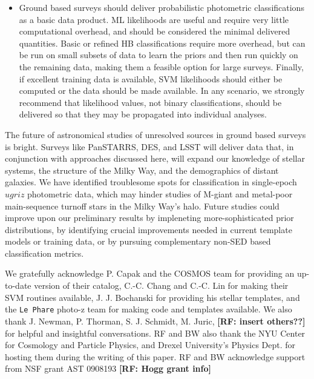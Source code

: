 \documentclass[12pt,preprint]{aastex}
\newcommand\rf[1]{{\bf [RF: #1]}}
\begin{document}
\begin{itemize}
\item Ground based surveys should deliver probabilistic photometric 
 classifications as a basic data product.  ML likelihoods are useful and 
 require very little computational overhead, and should be considered the 
 minimal delivered quantities.  Basic or refined HB classifications require 
 more overhead, but can be run on small subsets of data to learn the 
 priors and then run quickly on the remaining data, making them a feasible 
 option for large surveys.  Finally, if excellent training 
 data is available, SVM likelihoods should either be computed or the data 
 should be made available.  In any scenario, we strongly recommend that 
 likelihood values, not binary classifications, should be delivered so that 
 they may be propagated into individual analyses.

\end{itemize}

The future of astronomical studies of unresolved sources in ground
based surveys is bright.  Surveys like PanSTARRS, DES, and LSST will
deliver data that, in conjunction with approaches discussed here, will
expand our knowledge of stellar systems, the structure of the Milky
Way, and the demographics of distant galaxies.  We have identified
troublesome spots for classification in single-epoch $ugriz$
photometric data, which may hinder studies of M-giant and metal-poor
main-sequence turnoff stars in the Milky Way's halo.  Future studies
could improve upon our preliminary results by impleneting
more-sophisticated prior distributions, by identifying crucial
improvements needed in current template models or training data, or by
pursuing complementary non-SED based classification metrics.

\acknowledgments

We gratefully acknowledge P. Capak and the COSMOS team for providing
an up-to-date version of their catalog, C.-C. Chang and C.-C. Lin for
making their SVM routines available, J. J. Bochanski for providing his 
stellar templates, and the {\tt Le Phare} photo-z
team for making code and templates available.  We also thank J.
Newman, P. Thorman, S. J. Schmidt, M. Juric, \rf{insert
others??} for helpful and insightful conversations.  RF and BW also thank 
the NYU Center for Cosmology and Particle Physics, and 
Drexel University's Physics Dept. for hosting them during the writing of 
this paper.  RF and BW acknowledge support from NSF grant AST 
0908193 \rf{Hogg grant info}


\clearpage
\end{document}
